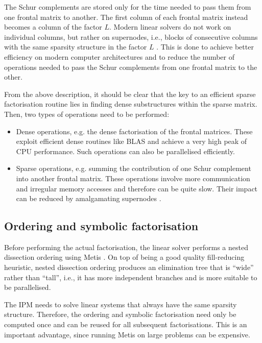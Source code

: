 \documentclass[a4paper]{article}
\newcommand{\0}{\mathbf 0}
\begin{document}
The Schur complements are stored only for the time needed to pass them from one frontal matrix to another. The first column of each frontal matrix instead becomes a column of the factor $L$. Modern linear solvers do not work on individual columns, but rather on supernodes, i.e., blocks of consecutive columns with the same sparsity structure in the factor $L$ \cite{LiuNgPey:supernodes}. This is done to achieve better efficiency on modern computer architectures and to reduce the number of operations needed to pass the Schur complements from one frontal matrix to the other.

From the above description, it should be clear that the key to an efficient sparse factorisation routine lies in finding dense substructures within the sparse matrix. Then, two types of operations need to be performed:
\begin{itemize}
\item Dense operations, e.g. the dense factorisation of the frontal matrices. These exploit efficient dense routines like BLAS \cite{DonDucHamDuf:blas} and achieve a very high peak of CPU performance. Such operations can also be parallelised efficiently. 
\item Sparse operations, e.g. summing the contribution of one Schur complement into another frontal matrix. These operations involve more communication and irregular memory accesses and therefore can be quite slow. Their impact can be reduced by amalgamating supernodes \cite{AshGri:supernodes}.
\end{itemize}

\subsection{Ordering and symbolic factorisation}

Before performing the actual factorisation, the linear solver performs a nested dissection ordering using Metis \cite{KarKum:metis}. On top of being a good quality fill-reducing heuristic, nested dissection ordering produces an elimination tree that is ``wide'' rather than ``tall'', i.e., it has more independent branches and is more suitable to be parallelised.

The IPM needs to solve linear systems that always have the same sparsity structure. Therefore, the ordering and symbolic factorisation need only be computed once and can be reused for all subsequent factorisations. This is an important advantage, since running Metis on large problems can be expensive. 
\end{document}
